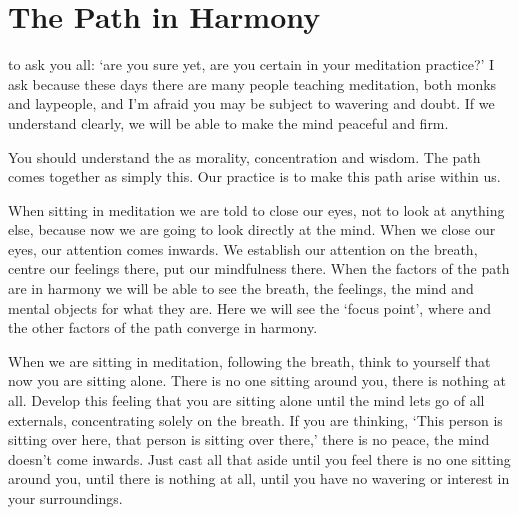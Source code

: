 
\chapter{The Path in Harmony}

\vspace*{0.5\baselineskip}
 to ask you all: `are you sure yet, are you certain in your meditation practice?' I ask because these days there are many people teaching meditation, both monks and laypeople, and I'm afraid you may be subject to wavering and doubt. If we understand clearly, we will be able to make the mind peaceful and firm. 

You should understand the  as morality, concentration and wisdom. The path comes together as simply this. Our practice is to make this path arise within us. 

When sitting in meditation we are told to close our eyes, not to look at anything else, because now we are going to look directly at the mind. When we close our eyes, our attention comes inwards. We establish our attention on the breath, centre our feelings there, put our mindfulness there. When the factors of the path are in harmony we will be able to see the breath, the feelings, the mind and mental objects for what they are. Here we will see the `focus point', where  and the other factors of the path converge in harmony. 

When we are sitting in meditation, following the breath, think to yourself that now you are sitting alone. There is no one sitting around you, there is nothing at all. Develop this feeling that you are sitting alone until the mind lets go of all externals, concentrating solely on the breath. If you are thinking, `This person is sitting over here, that person is sitting over there,' there is no peace, the mind doesn't come inwards. Just cast all that aside until you feel there is no one sitting around you, until there is nothing at all, until you have no wavering or interest in your surroundings. 

